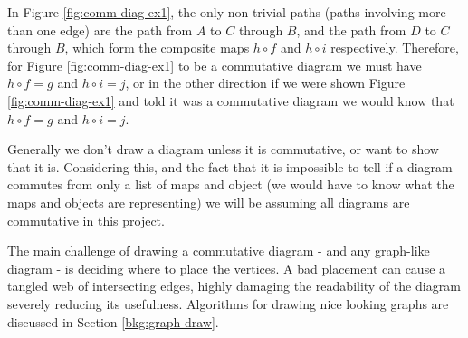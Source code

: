\documentclass[logo,bsc,singlespacing,parskip]{infthesis}
\theoremstyle{definition}
\begin{document}
In Figure \ref{fig:comm-diag-ex1}, the only non-trivial paths (paths involving more than one edge) are the path from $A$ to $C$ through $B$, and the path from $D$ to $C$ through $B$, which form the composite maps $h \circ f$ and $h \circ i$ respectively. Therefore, for Figure \ref{fig:comm-diag-ex1} to be a commutative diagram we must have $h \circ f = g$ and $h \circ i = j$, or in the other direction if we were shown Figure \ref{fig:comm-diag-ex1} and told it was a commutative diagram we would know that $h \circ f = g$ and $h \circ i = j$.

Generally we don't draw a diagram unless it is commutative, or want to show that it is. Considering this, and the fact that it is impossible to tell if a diagram commutes from only a list of maps and object (we would have to know what the maps and objects are representing) we will be assuming all diagrams are commutative in this project.

The main challenge of drawing a commutative diagram - and any graph-like diagram - is deciding where to place the vertices. A bad placement can cause a tangled web of intersecting edges, highly damaging the readability of the diagram severely reducing its usefulness. Algorithms for drawing nice looking graphs are discussed in Section \ref{bkg:graph-draw}.




\end{document}
